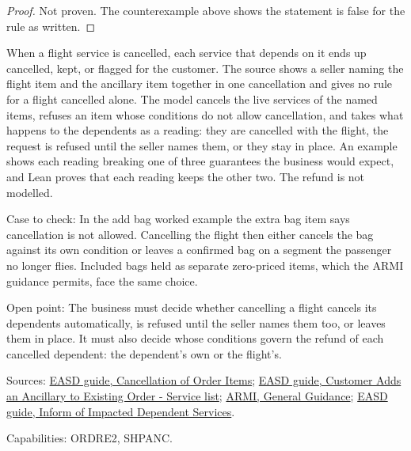 \begin{proof}
  Not proven.  The counterexample above shows the statement is false for the
  rule as written.
\end{proof}

\begin{definition}
  \label{def:ancillaries-flight-cancel-dependents}
  When a flight service is cancelled, each service that depends on it ends
  up cancelled, kept, or flagged for the customer. The source shows a seller
  naming the flight item and the ancillary item together in one cancellation
  and gives no rule for a flight cancelled alone.
  The model cancels the live services of the named items, refuses an item
  whose conditions do not allow cancellation, and takes what happens to the
  dependents as a reading: they are cancelled with the flight, the request is
  refused until the seller names them, or they stay in place.  An example
  shows each reading breaking one of three guarantees the business would
  expect, and Lean proves that each reading keeps the other two.  The
  refund is not modelled.

  Case to check: In the add bag worked example the extra bag item says
  cancellation is not allowed. Cancelling the flight then either cancels the
  bag against its own condition or leaves a confirmed bag on a segment the
  passenger no longer flies. Included bags held as separate zero-priced
  items, which the ARMI guidance permits, face the same choice.

  Open point: The business must decide whether cancelling a flight cancels
  its dependents automatically, is refused until the seller names them too,
  or leaves them in place. It must also decide whose conditions govern the
  refund of each cancelled dependent: the dependent's own or the flight's.

  Sources: \href{https://standards.atlassian.net/wiki/spaces/EASD/pages/574783569}{EASD guide, Cancellation of Order Items};
  \href{https://standards.atlassian.net/wiki/spaces/EASD/pages/842301531}{EASD guide, Customer Adds an Ancillary to Existing Order - Service list};
  \href{https://standards.atlassian.net/wiki/spaces/ARMI/pages/584318980}{ARMI, General Guidance};
  \href{https://standards.atlassian.net/wiki/spaces/EASD/pages/672825400}{EASD guide, Inform of Impacted Dependent Services}.

  Capabilities: ORDRE2, SHPANC.
\end{definition}

